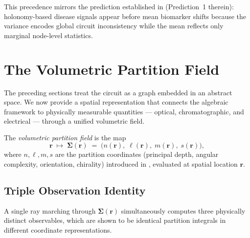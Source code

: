 This precedence mirrors the prediction established in 
(Prediction~1 therein): holonomy-based disease signals appear before mean
biomarker shifts because the variance encodes global circuit inconsistency
while the mean reflects only marginal node-level statistics.

\section{The Volumetric Partition Field}
\label{sec:partition-field}

The preceding sections treat the circuit as a graph embedded in an abstract
space.  We now provide a spatial representation that connects the algebraic
framework to physically measurable quantities — optical, chromatographic, and
electrical — through a unified volumetric field.

\begin{definition}
\label{def:partition-field}
The \emph{volumetric partition field} is the map
\begin{equation}
  \mathbf{r} \;\longmapsto\;
  \boldsymbol{\Sigma}(\mathbf{r})
  \;=\;
  \bigl(n(\mathbf{r}),\;\ell(\mathbf{r}),\;m(\mathbf{r}),\;s(\mathbf{r})\bigr),
  \label{eq:partition-field}
\end{equation}
where $n, \ell, m, s$ are the partition coordinates (principal depth, angular
complexity, orientation, chirality) introduced in ,
evaluated at spatial location $\mathbf{r}$.
\end{definition}

\subsection{Triple Observation Identity}

A single ray marching through $\boldsymbol{\Sigma}(\mathbf{r})$ simultaneously
computes three physically distinct observables, which are shown to be identical
partition integrals in different coordinate representations.

